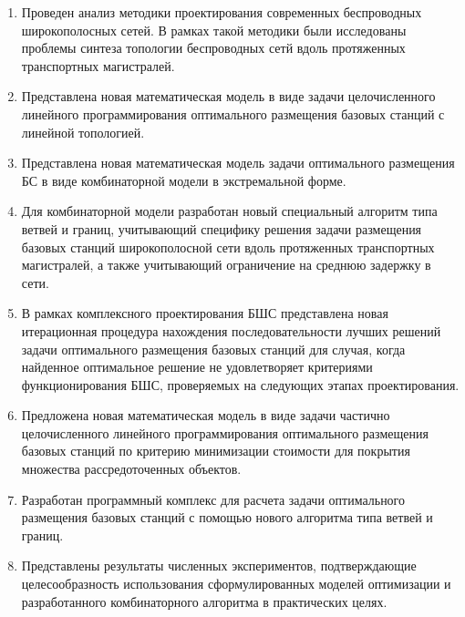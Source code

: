 
\begin{enumerate}
    \item Проведен анализ методики проектирования современных беспроводных широкополосных сетей. В рамках такой методики были исследованы проблемы синтеза топологии беспроводных сетй вдоль протяженных транспортных магистралей. 
    \item Представлена новая математическая модель в виде задачи целочисленного линейного программирования оптимального размещения базовых станций с линейной топологией.
    \item Представлена новая математическая модель задачи оптимального размещения БС в виде комбинаторной модели в экстремальной форме. 
    \item Для комбинаторной модели разработан новый специальный алгоритм типа ветвей и границ, учитывающий специфику решения задачи размещения базовых станций широкополосной сети вдоль протяженных транспортных магистралей, а также учитывающий ограничение на среднюю задержку в сети.  
    
    \item В рамках комплексного проектирования БШС представлена новая итерационная процедура нахождения последовательности лучших решений задачи оптимального размещения базовых станций для случая, когда найденное оптимальное решение не удовлетворяет  критериями функционирования БШС, проверяемых на следующих этапах проектирования.
    \item Предложена новая математическая модель в виде задачи частично целочисленного линейного программирования оптимального размещения базовых станций по критерию минимизации стоимости для покрытия множества рассредоточенных объектов. 
    \item Разработан программный комплекс для расчета задачи оптимального размещения базовых станций с помощью нового алгоритма типа ветвей и границ.
    \item Представлены результаты численных экспериментов, подтверждающие целесообразность использования сформулированных моделей оптимизации и разработанного комбинаторного алгоритма в практических целях. 
\end{enumerate}

